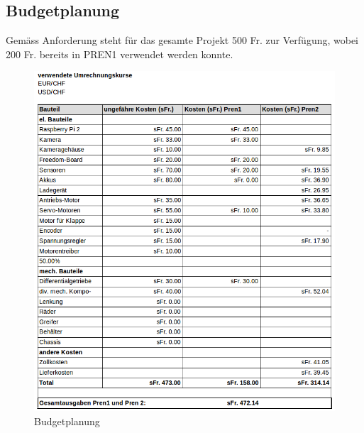 \newpage
\subsection{Budgetplanung}
Gemäss Anforderung steht für das gesamte Projekt 500 Fr. zur Verfügung, wobei 200 Fr. bereits in PREN1 verwendet werden konnte.
\begin{figure}[H]%
\centering
\includegraphics[width=1\textwidth]{04_Projektmanagement/fig/budgetplanung.png}
\caption{Budgetplanung}
\label{fig:scrumBoard}
\end{figure}
